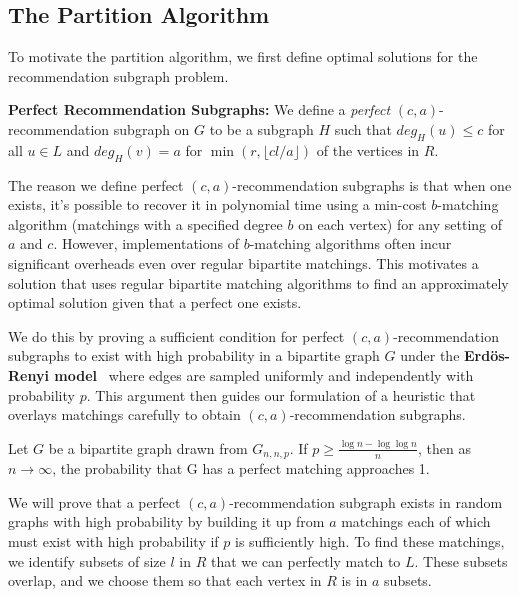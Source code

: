 \subsection{The Partition Algorithm}
To motivate the partition algorithm, we first define optimal solutions for the recommendation subgraph problem.
 

{\bf Perfect Recommendation Subgraphs:} We define a \emph{perfect} $(c,a)$-recommendation subgraph on $G$ to be a subgraph $H$ such that
$deg_H(u)\leq c$ for all $u\in L$ and $deg_H(v)=a$ for
$\min(r,\lfloor cl/a \rfloor)$ of the vertices in $R$.
 

The reason we define perfect $(c,a)$-recommendation subgraphs is that when one
exists, it's possible to recover it in polynomial time using a min-cost
$b$-matching algorithm (matchings with a specified degree $b$ on each vertex)
for any setting of $a$ and $c$. However, implementations of $b$-matching
algorithms often incur significant overheads even over regular bipartite matchings.
This motivates a solution that uses regular bipartite matching algorithms to find
an approximately optimal solution given that a perfect one exists.  

We do this by proving a sufficient condition for perfect $(c,a)$-recommendation
subgraphs to exist with high probability in a bipartite graph $G$ under the
{\bf Erd\"os-Renyi model}~\cite{ErdosRenyi59} where edges are sampled uniformly and
independently with probability $p$. This argument then guides our formulation of
a heuristic that overlays matchings carefully to obtain $(c,a)$-recommendation
subgraphs.  

\begin{thm}\cite{Janson2011}
\label{random_matching_threshold}
Let $G$ be a bipartite graph drawn from $G_{n, n, p}$. If $p \geq \frac{\log n -
\log\log n}{n}$, then as $n\to\infty$,  the probability that G has a perfect
    matching approaches 1.
\end{thm}

We will prove that a perfect $(c,a)$-recommendation subgraph exists in
random graphs with high probability by building it up from $a$
matchings each of which must exist with high probability if $p$ is
sufficiently high. To find these matchings, we identify subsets of size
$l$ in $R$ that we can perfectly match to $L$. These subsets overlap,
and we choose them so that each vertex in $R$ is in $a$ subsets.

